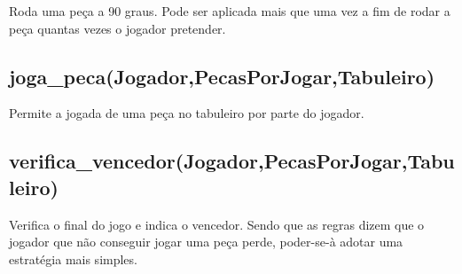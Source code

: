 \documentclass[a4paper]{article}
\begin{document}
Roda uma peça a 90 graus. Pode ser aplicada mais que uma vez a fim de rodar a peça quantas vezes o jogador pretender.

\subsection{joga\_peca(Jogador,PecasPorJogar,Tabuleiro)}

Permite a jogada de uma peça no tabuleiro por parte do jogador.

\subsection{verifica\_vencedor(Jogador,PecasPorJogar,Tabuleiro)}
Verifica o final do jogo e indica o vencedor. Sendo que as regras dizem que o jogador que não conseguir jogar uma peça perde, poder-se-à adotar uma estratégia mais simples.
\end{document}
